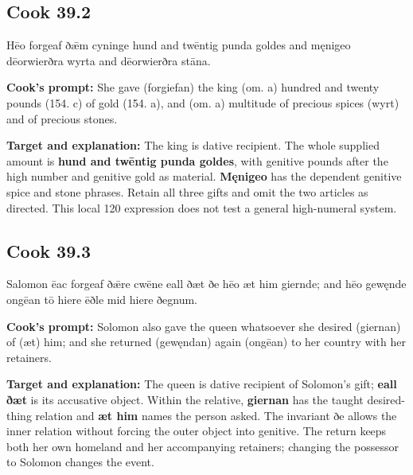 \par\begin{minipage}{\linewidth}\raggedright
\subsection*{Cook 39.2}

Hēo forgeaf ðǣm cyninge hund and twēntig punda goldes and męnigeo dēorwierðra wyrta and dēorwierðra stāna.

\textbf{Cook's prompt:} She gave (forgiefan) the king (om. a) hundred and twenty pounds (154. c) of gold (154. a), and (om. a) multitude of precious spices (wyrt) and of precious stones.

\textbf{Target and explanation:} The king is dative recipient. The whole supplied amount is \textbf{hund and twēntig punda goldes}, with genitive pounds after the high number and genitive gold as material. \textbf{Męnigeo} has the dependent genitive spice and stone phrases. Retain all three gifts and omit the two articles as directed. This local 120 expression does not test a general high-numeral system.

\end{minipage}\par\addvspace{4pt}

\par\begin{minipage}{\linewidth}\raggedright
\subsection*{Cook 39.3}

Salomon ēac forgeaf ðǣre cwēne eall ðæt ðe hēo æt him giernde; and hēo gewęnde ongēan tō hiere ēðle mid hiere ðegnum.

\textbf{Cook's prompt:} Solomon also gave the queen whatsoever she desired (giernan) of (æt) him; and she returned (gewęndan) again (ongēan) to her country with her retainers.

\textbf{Target and explanation:} The queen is dative recipient of Solomon's gift; \textbf{eall ðæt} is its accusative object. Within the relative, \textbf{giernan} has the taught desired-thing relation and \textbf{æt him} names the person asked. The invariant ðe allows the inner relation without forcing the outer object into genitive. The return keeps both her own homeland and her accompanying retainers; changing the possessor to Solomon changes the event.

\end{minipage}\par\addvspace{4pt}

